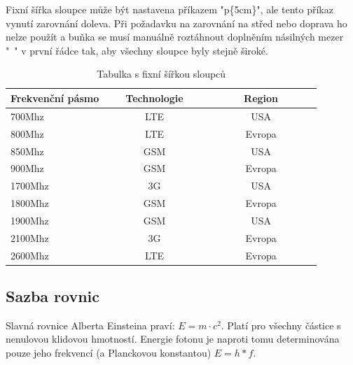 \documentclass[12pt,a4paper,oneside]{article}
\numberwithin{equation}{section} %
\numberwithin{figure}{section} %
\numberwithin{table}{section} %
\begin{document}
Fixní šířka sloupce může být nastavena příkazem "p\{5cm\}", ale tento příkaz vynutí zarovnání doleva. Při požadavku na zarovnání na střed nebo doprava ho nelze použít a buňka se musí manuálně roztáhnout doplněním násilných mezer "~" v první řádce tak, aby všechny sloupce byly stejně široké.

\begin{table}[h] %
\caption{Tabulka s fixní šířkou sloupců}
\begin{center} %
\begin{tabular}{|l|c|c|} %
\hline %
\textbf{Frekvenční pásmo} & \textbf{~~~Technologie~~~} & \textbf{~~~~~~Region~~~~~~} \\ %
\hline %
700Mhz & LTE & USA \\ %
\hline %
800Mhz & LTE & Evropa \\ %
\hline %
850Mhz & GSM & USA \\ %
\hline 
900Mhz & GSM & Evropa \\ 
\hline
1700Mhz & 3G & USA \\ 
\hline
1800Mhz & GSM & Evropa \\ 
\hline
1900Mhz & GSM & USA \\ 
\hline 
2100Mhz & 3G & Evropa \\ 
\hline
2600Mhz & LTE & Evropa \\ 
\hline
\end{tabular}
\end{center}
\end{table} 


\subsection{Sazba rovnic}
Slavná rovnice Alberta Einsteina praví: $E = m \cdot c^2$. Platí pro všechny částice s nenulovou klidovou hmotností. Energie fotonu je naproti tomu determinována pouze jeho frekvencí (a Planckovou konstantou) $E = h * f$.
\end{document}

